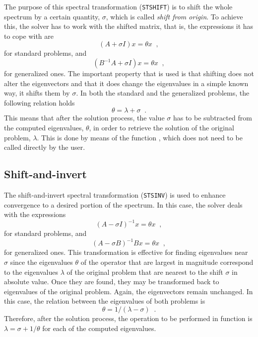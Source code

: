 	The purpose of this spectral transformation (\texttt{STSHIFT}) is to shift the whole spectrum by a certain quantity, $\sigma$, which is called \emph{shift from origin}. To achieve this, the solver has to work with the shifted matrix, that is, the expressions it has to cope with are
\begin{equation}(A+\sigma I)x=\theta x\;\;,\end{equation}
for standard problems, and 
\begin{equation}(B^{-1}A+\sigma I) x=\theta x\;\;,\end{equation}
for generalized ones. The important property that is used is that shifting does not alter the eigenvectors and that it does change the eigenvalues in a simple known way, it shifts them by $\sigma$. In both the standard and the generalized problems, the following relation holds 
\begin{equation}\theta=\lambda+\sigma\;\;.\end{equation}
This means that after the solution process, the value $\sigma$ has to be subtracted from the computed eigenvalues, $\theta$, in order to retrieve the solution of the original problem, $\lambda$. This is done by means of the function , which does not need to be called directly by the user.

\subsection{Shift-and-invert}

	The shift-and-invert spectral transformation (\texttt{STSINV}) is used to enhance convergence to a desired portion of the spectrum. In this case, the solver deals with the expressions 
\begin{equation}(A-\sigma I)^{-1}x=\theta x\;\;,\end{equation}
for standard problems, and 
\begin{equation}(A-\sigma B)^{-1}B x=\theta x\;\;,\end{equation}
for generalized ones. 
This transformation is effective for finding eigenvalues near $\sigma$ since the eigenvalues $\theta$ of the operator that are largest in magnitude correspond to the eigenvalues $\lambda$ of the original problem that are nearest to the shift $\sigma$ in absolute value. Once they are found, they may be transformed back to eigenvalues of the original problem. Again, the eigenvectors remain unchanged.
In this case, the relation between the eigenvalues of both problems is
\begin{equation}\theta=1/(\lambda-\sigma)\;\;.\end{equation}
Therefore, after the solution process, the operation to be performed in function  is $\lambda=\sigma+1/\theta$ for each of the computed eigenvalues.

